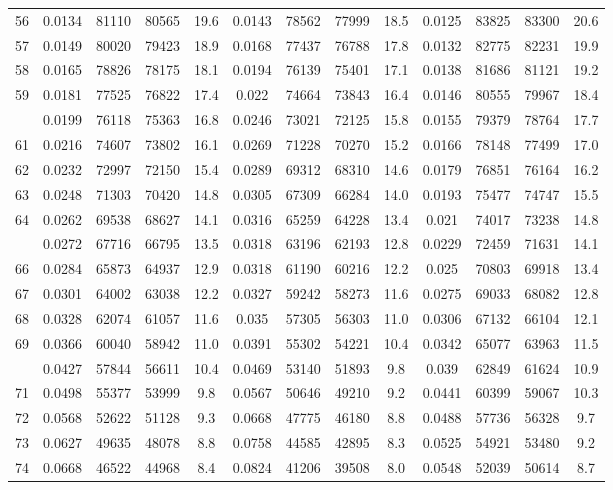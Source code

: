 \documentclass[
  14pt,
]{article}
\begin{document}
\begin{longtable}[t]{lcccccccccccc}
56 & 0.0134 & 81110 & 80565 & 19.6 & 0.0143 & 78562 & 77999 & 18.5 & 0.0125 & 83825 & 83300 & 20.6\\
57 & 0.0149 & 80020 & 79423 & 18.9 & 0.0168 & 77437 & 76788 & 17.8 & 0.0132 & 82775 & 82231 & 19.9\\
58 & 0.0165 & 78826 & 78175 & 18.1 & 0.0194 & 76139 & 75401 & 17.1 & 0.0138 & 81686 & 81121 & 19.2\\
59 & 0.0181 & 77525 & 76822 & 17.4 & 0.022 & 74664 & 73843 & 16.4 & 0.0146 & 80555 & 79967 & 18.4\\
\addlinespace
60 & 0.0199 & 76118 & 75363 & 16.8 & 0.0246 & 73021 & 72125 & 15.8 & 0.0155 & 79379 & 78764 & 17.7\\
61 & 0.0216 & 74607 & 73802 & 16.1 & 0.0269 & 71228 & 70270 & 15.2 & 0.0166 & 78148 & 77499 & 17.0\\
62 & 0.0232 & 72997 & 72150 & 15.4 & 0.0289 & 69312 & 68310 & 14.6 & 0.0179 & 76851 & 76164 & 16.2\\
63 & 0.0248 & 71303 & 70420 & 14.8 & 0.0305 & 67309 & 66284 & 14.0 & 0.0193 & 75477 & 74747 & 15.5\\
64 & 0.0262 & 69538 & 68627 & 14.1 & 0.0316 & 65259 & 64228 & 13.4 & 0.021 & 74017 & 73238 & 14.8\\
\addlinespace
65 & 0.0272 & 67716 & 66795 & 13.5 & 0.0318 & 63196 & 62193 & 12.8 & 0.0229 & 72459 & 71631 & 14.1\\
66 & 0.0284 & 65873 & 64937 & 12.9 & 0.0318 & 61190 & 60216 & 12.2 & 0.025 & 70803 & 69918 & 13.4\\
67 & 0.0301 & 64002 & 63038 & 12.2 & 0.0327 & 59242 & 58273 & 11.6 & 0.0275 & 69033 & 68082 & 12.8\\
68 & 0.0328 & 62074 & 61057 & 11.6 & 0.035 & 57305 & 56303 & 11.0 & 0.0306 & 67132 & 66104 & 12.1\\
69 & 0.0366 & 60040 & 58942 & 11.0 & 0.0391 & 55302 & 54221 & 10.4 & 0.0342 & 65077 & 63963 & 11.5\\
\addlinespace
70 & 0.0427 & 57844 & 56611 & 10.4 & 0.0469 & 53140 & 51893 & 9.8 & 0.039 & 62849 & 61624 & 10.9\\
71 & 0.0498 & 55377 & 53999 & 9.8 & 0.0567 & 50646 & 49210 & 9.2 & 0.0441 & 60399 & 59067 & 10.3\\
72 & 0.0568 & 52622 & 51128 & 9.3 & 0.0668 & 47775 & 46180 & 8.8 & 0.0488 & 57736 & 56328 & 9.7\\
73 & 0.0627 & 49635 & 48078 & 8.8 & 0.0758 & 44585 & 42895 & 8.3 & 0.0525 & 54921 & 53480 & 9.2\\
74 & 0.0668 & 46522 & 44968 & 8.4 & 0.0824 & 41206 & 39508 & 8.0 & 0.0548 & 52039 & 50614 & 8.7\\

\end{longtable}
\end{document}
